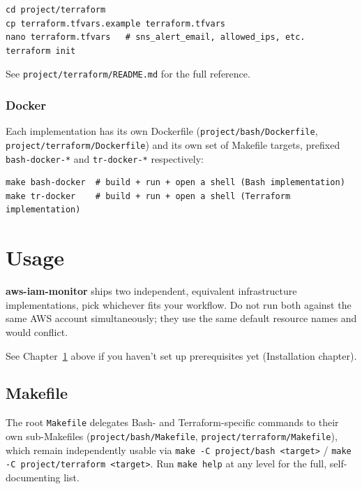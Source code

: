 \documentclass[11pt,a4paper]{report}
\begin{document}
\begin{lstlisting}
cd project/terraform
cp terraform.tfvars.example terraform.tfvars
nano terraform.tfvars   # sns_alert_email, allowed_ips, etc.
terraform init
\end{lstlisting}

See \texttt{project/terraform/README.md} for the full reference.

\subsection{Docker}

Each implementation has its own Dockerfile
(\texttt{project/bash/Dockerfile}, \texttt{project/terraform/Dockerfile})
and its own set of Makefile targets, prefixed \texttt{bash-docker-*} and
\texttt{tr-docker-*} respectively:

\begin{lstlisting}
make bash-docker  # build + run + open a shell (Bash implementation)
make tr-docker    # build + run + open a shell (Terraform implementation)
\end{lstlisting}

\chapter{Usage}
\label{chap:usage}

\textbf{aws-iam-monitor} ships two independent, equivalent infrastructure
implementations, pick whichever fits your workflow. Do not run both against
the same AWS account simultaneously; they use the same default resource
names and would conflict.

\begin{notebox}[Important]
See Chapter~\ref{chap:usage} above if you haven't set up prerequisites yet
(Installation chapter).
\end{notebox}

\section{Makefile}

The root \texttt{Makefile} delegates Bash- and Terraform-specific commands
to their own sub-Makefiles (\texttt{project/bash/Makefile},
\texttt{project/terraform/Makefile}), which remain independently usable via
\texttt{make -C project/bash <target>} / \texttt{make -C project/terraform
<target>}. Run \texttt{make help} at any level for the full,
self-documenting list.
\end{document}
